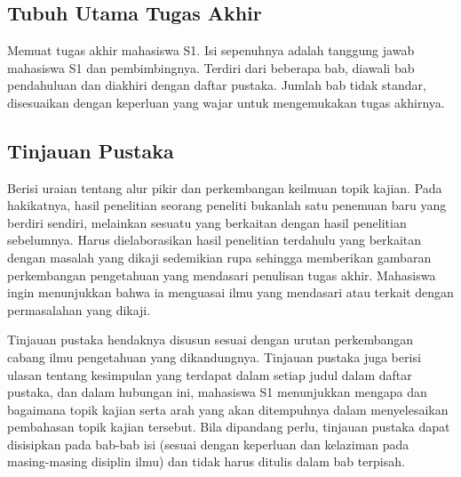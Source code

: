 \chapter{\babDua}

\section{Tubuh Utama Tugas Akhir}
Memuat tugas akhir mahasiswa S1. Isi sepenuhnya adalah tanggung jawab mahasiswa S1 dan pembimbingnya. Terdiri dari beberapa bab, diawali bab pendahuluan dan diakhiri dengan daftar pustaka. Jumlah bab tidak standar, disesuaikan dengan keperluan yang wajar untuk mengemukakan tugas akhirnya.

\section{Tinjauan Pustaka}
Berisi uraian tentang alur pikir dan perkembangan keilmuan topik kajian. Pada hakikatnya, hasil penelitian seorang peneliti bukanlah satu penemuan baru yang berdiri sendiri, melainkan sesuatu yang berkaitan dengan hasil penelitian sebelumnya. Harus dielaborasikan hasil penelitian terdahulu yang berkaitan dengan masalah yang dikaji sedemikian rupa sehingga memberikan gambaran perkembangan pengetahuan yang mendasari penulisan tugas akhir. Mahasiswa ingin menunjukkan bahwa ia menguasai ilmu yang mendasari atau terkait dengan permasalahan yang dikaji.

Tinjauan pustaka hendaknya disusun sesuai dengan urutan perkembangan cabang ilmu pengetahuan yang dikandungnya. Tinjauan pustaka juga berisi ulasan tentang kesimpulan yang terdapat dalam setiap judul dalam daftar pustaka, dan dalam hubungan ini, mahasiswa S1 menunjukkan mengapa dan bagaimana topik kajian serta arah yang akan ditempuhnya dalam menyelesaikan pembahasan topik kajian tersebut. Bila dipandang perlu, tinjauan pustaka dapat disisipkan pada bab-bab isi (sesuai dengan keperluan dan kelaziman pada masing-masing disiplin ilmu) dan tidak harus ditulis dalam bab terpisah.

